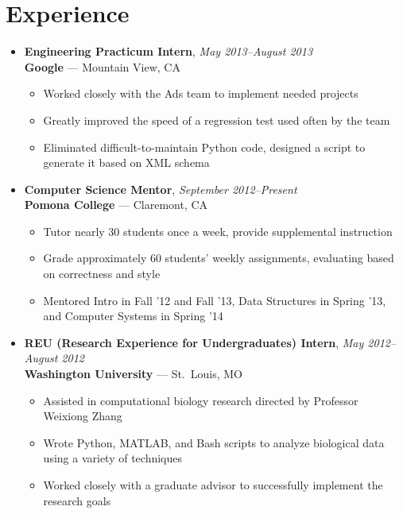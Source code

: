 \documentclass[11pt]{article}
\newcommand\experienceentry[4]{{
    \textbf{#3}, \textit{#4} \\
    \textbf{#1} --- #2
}}
\begin{document}
\section*{Experience}
\begin{itemize}[label=,leftmargin=0]
    \item \experienceentry{Google}{Mountain View, CA}
        {Engineering Practicum Intern}{May 2013--August 2013}
    \begin{itemize}
        \item Worked closely with the Ads team to implement needed projects
        \item Greatly improved the speed of a regression test used often by
            the team
        \item Eliminated difficult-to-maintain Python code, designed a script
            to generate it based on XML schema
    \end{itemize}

    \item \experienceentry{Pomona College}{Claremont, CA}
        {Computer Science Mentor}{September 2012--Present}
    \begin{itemize}
        \item Tutor nearly 30 students once a week, provide supplemental
            instruction
        \item Grade approximately 60 students' weekly assignments, evaluating
            based on correctness and style
        \item Mentored Intro in Fall '12 and Fall '13, Data Structures in
            Spring '13, and Computer Systems in Spring '14
    \end{itemize}

    \item \experienceentry{Washington University}{St.~Louis, MO}
        {REU (Research Experience for Undergraduates) Intern}{May 2012--August 2012}
    \begin{itemize}
        \item Assisted in computational biology research directed by Professor
            Weixiong Zhang
        \item Wrote Python, MATLAB, and Bash scripts to analyze biological
            data using a variety of techniques
        \item Worked closely with a graduate advisor to successfully implement
            the research goals
    \end{itemize}
\end{itemize}
\end{document}
